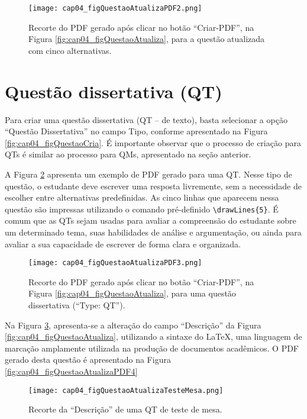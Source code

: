\begin{figure}[!ht]
  \texttt{[image: cap04\_figQuestaoAtualizaPDF2.png]}
  \caption{Recorte do PDF gerado após clicar no botão ``Criar-PDF'', na Figura \ref{fig:cap04_figQuestaoAtualiza}, para a questão atualizada com cinco alternativas.}
  \label{fig:cap04_figQuestaoAtualizaPDF2}
\end{figure}


\section{Questão dissertativa (QT)}\label{sec:introducaoTextoQT}

Para criar uma questão dissertativa (QT -- de texto), basta selecionar a opção ``Questão Dissertativa'' no campo Tipo, conforme apresentado na Figura \ref{fig:cap04_figQuestaoCria}. É importante observar que o processo de criação para QTs é similar ao processo para QMs, apresentado na seção anterior.

A Figura \ref{fig:cap04_figQuestaoAtualizaPDF3} apresenta um exemplo de PDF gerado para uma QT. Nesse tipo de questão, o estudante deve escrever uma resposta livremente, sem a necessidade de escolher entre alternativas predefinidas. As cinco linhas que aparecem nessa questão são impressas utilizando o comando pré-definido \verb|\drawLines{5}|. É comum que as QTs sejam usadas para avaliar a compreensão do estudante sobre um determinado tema, suas habilidades de análise e argumentação, ou ainda para avaliar a sua capacidade de escrever de forma clara e organizada.

\begin{figure}[!ht]
  \texttt{[image: cap04\_figQuestaoAtualizaPDF3.png]}
  \caption{Recorte do PDF gerado após clicar no botão ``Criar-PDF'', na Figura \ref{fig:cap04_figQuestaoAtualiza}, para uma questão dissertativa (``Type: QT'').}
  \label{fig:cap04_figQuestaoAtualizaPDF3}
\end{figure}

Na Figura \ref{fig:cap04_figQuestaoAtualizaTesteMesa}, apresenta-se a alteração do campo ``Descrição'' da Figura \ref{fig:cap04_figQuestaoAtualiza}, utilizando a sintaxe do \LaTeX, uma linguagem de marcação amplamente utilizada na produção de documentos acadêmicos. O PDF gerado desta questão é apresentado na Figura \ref{fig:cap04_figQuestaoAtualizaPDF4}

\begin{figure}[!ht]
  \texttt{[image: cap04\_figQuestaoAtualizaTesteMesa.png]}
  \caption{Recorte da ``Descrição'' de uma QT de teste de mesa.}
  \label{fig:cap04_figQuestaoAtualizaTesteMesa}
\end{figure}

